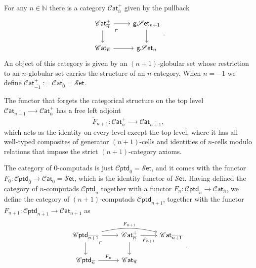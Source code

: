 \documentclass[12pt,a4paper]{article}
\numberwithin{equation}{section}
\newcommand{\cat}[1]{\mathscr{C} \mathsf{at}_{\overline{#1}}}
\newcommand{\cptd}[1]{\mathscr{C} \mathsf{ptd}_{\overline{#1}}}
\newcommand{\gset}{\mathsf{g} \mathscr{S} \mathsf{et}}
\newcommand{\set}{\mathscr{S} \mathsf{et}}
\begin{document}
\begin{definition}
    For any $n \in \mathbb{N}$ there is a category $\cat{n}^+$ given by the pullback
    \begin{equation}
        \begin{tikzcd}
            \cat{n}^+ \arrow[rd, phantom, very near start, "\ulcorner"] \arrow[r] \arrow[d] & \gset_{n+1} \arrow[d] \\
            \cat{n} \arrow[r] & \gset_n
        \end{tikzcd}.
    \end{equation}
    An object of this category is given by an $(n+1)$-globular set whose restriction to an $n$-globular set carries the structure of an $n$-category. When $n=-1$ we define $\cat{-1}^+ := \cat{0} = \set$.
\end{definition}

\begin{proposition}
    The functor that forgets the categorical structure on the top level $\cat{n+1} \xrightarrow{\qquad} \cat{n}^+$ has a free left adjoint
    \begin{equation}
        \tilde{F}_{n+1}: \cat{n}^+ \xrightarrow{\qquad} \cat{n+1},
    \end{equation}
    which acts as the identity on every level except the top level, where it has all well-typed composites of generator $(n+1)$-cells and identities of $n$-cells modulo relations that impose the strict $(n+1)$-category axioms.
\end{proposition}

\begin{definition}
    The category of $0$-computads is just $\cptd{0} = \set$, and it comes with the functor $F_0: \cptd{0} \to \cat{0} = \set$, which is the identity functor of $\set$. Having defined the category of $n$-computads $\cptd{n}$ together with a functor $F_n:\cptd{n} \to \cat{n}$, we define the category of $(n+1)$-computads $\cptd{n+1}$, together with the functor $F_{n+1}: \cptd{n+1} \to \cat{n+1}$ as
    \vspace{-0.3cm}
    \begin{equation}
        \begin{tikzcd}
            \cptd{n+1} \arrow[rd, phantom, very near start, "\ulcorner"] \arrow[r] \arrow[rr, bend left=3ex, "F_{n+1}"] \arrow[d] & \cat{n}^+ \arrow[r, "\tilde{F}_{n+1}"']\arrow[d] & \cat{n+1} \\
            \cptd{n} \arrow[r, "F_n"] & \cat{n} &
        \end{tikzcd}.
    \end{equation}
\end{definition}
\end{document}
